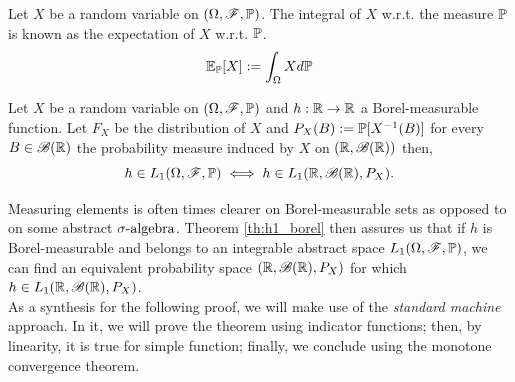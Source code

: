 \documentclass[../TGMAFFIRO.tex]{subfiles}
\begin{document}
\begin{definition}
	Let $X$ be a random variable on $(\Omega, \mathscr{F}, \mathbb{P})$. The integral of $X$ w.r.t. the measure $\mathbb{P}$ is known as the expectation of $X$ w.r.t. $\mathbb{P}$. 
	\begin{equation}
		\mathbb{E}_{\mathbb{P}}[X] := \int_\Omega X d\mathbb{P}
	\end{equation}
\end{definition}


\begin{theorem}\label{th:h1_borel}
		Let $X$ be a random variable on $(\Omega, \mathscr{F}, \mathbb{P})$ and $h: \mathbb{R} \to \mathbb{R}$ a Borel-measurable function. Let $F_X$ be the distribution of $X$ and $P_X(B):= \mathbb{P}[X^{-1}(B)]$ for every $B \in \mathscr{B}(\mathbb{R})$ the probability measure induced by $X$ on $(\mathbb{R}, \mathscr{B}(\mathbb{R}))$ then,
		\begin{equation}
			h \in L_1(\Omega, \mathscr{F}, \mathbb{P}) \iff h \in L_1(\mathbb{R}, \mathscr{B}(\mathbb{R}), P_X).
		\end{equation}
\end{theorem}

Measuring elements is often times clearer on Borel-measurable sets as opposed to on some abstract $\sigma\text{-algebra}$. Theorem \ref{th:h1_borel} then assures us that if $h$ is Borel-measurable and belongs to an integrable abstract space $L_1(\Omega, \mathscr{F}, \mathbb{P})$, we can find an equivalent probability space $(\mathbb{R}, \mathscr{B}(\mathbb{R}), P_X)$ for which $h \in L_1(\mathbb{R}, \mathscr{B}(\mathbb{R}), P_X)$.\\

As a synthesis for the following proof, we will make use of the \textit{standard machine} approach. In it, we will prove the theorem using indicator functions; then, by linearity, it is true for simple function; finally, we conclude using the monotone convergence theorem.\\
\end{document}
